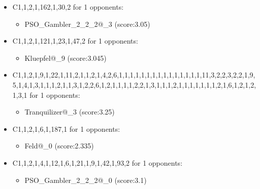\begin{appendices}
\begin{itemize}
        \item C1,1,2,1,162,1,30,2 for 1 opponents:
        \begin{multicols}{3}
            \begin{itemize}
                \item PSO\_Gambler\_2\_2\_2@\_3 (score:3.05)
            \end{itemize}
        \end{multicols}

        \item C1,1,2,1,121,1,23,1,47,2 for 1 opponents:
        \begin{multicols}{3}
            \begin{itemize}
                \item Kluepfel@\_9 (score:3.045)
            \end{itemize}
        \end{multicols}

        \item C1,1,2,1,9,1,22,1,11,2,1,1,2,1,4,2,6,1,1,1,1,1,1,1,1,1,1,1,1,1,1,1,11,3,2,2,3,2,2,1,9,5,1,4,1,3,1,1,1,2,1,1,3,1,2,2,6,1,2,1,1,1,1,2,2,1,3,1,1,1,2,1,1,1,1,1,1,1,2,1,6,1,2,1,2,1,3,1 for 1 opponents:
        \begin{multicols}{3}
            \begin{itemize}
                \item Tranquilizer@\_3 (score:3.25)
            \end{itemize}
        \end{multicols}

        \item C1,1,2,1,6,1,187,1 for 1 opponents:
        \begin{multicols}{3}
            \begin{itemize}
                \item Feld@\_0 (score:2.335)
            \end{itemize}
        \end{multicols}

        \item C1,1,2,1,4,1,12,1,6,1,21,1,9,1,42,1,93,2 for 1 opponents:
        \begin{multicols}{3}
            \begin{itemize}
                \item PSO\_Gambler\_2\_2\_2@\_0 (score:3.1)
            \end{itemize}
        \end{multicols}


\end{itemize}
\end{appendices}
